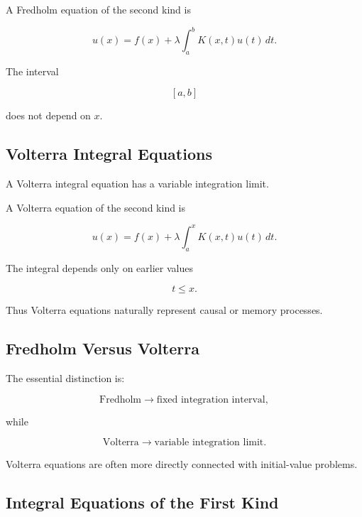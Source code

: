 A Fredholm equation of the second kind is

\[
\boxed{
u(x)
=
f(x)
+
\lambda
\int_a^b
K(x,t)u(t)\,dt.
}
\]

The interval

\[
[a,b]
\]

does not depend on \(x\).

\subsection{Volterra Integral Equations}
\label{subsec:volterra-integral-equations}

A Volterra integral equation has a variable integration limit.

A Volterra equation of the second kind is

\[
\boxed{
u(x)
=
f(x)
+
\lambda
\int_a^x
K(x,t)u(t)\,dt.
}
\]

The integral depends only on earlier values

\[
t\leq x.
\]

Thus Volterra equations naturally represent causal or memory processes.

\subsection{Fredholm Versus Volterra}
\label{subsec:fredholm-versus-volterra}

The essential distinction is:

\[
\boxed{
\text{Fredholm}
\rightarrow
\text{fixed integration interval},
}
\]

while

\[
\boxed{
\text{Volterra}
\rightarrow
\text{variable integration limit}.
}
\]

Volterra equations are often more directly connected with initial-value
problems.

\subsection{Integral Equations of the First Kind}
\label{subsec:first-kind-integral-equations}

